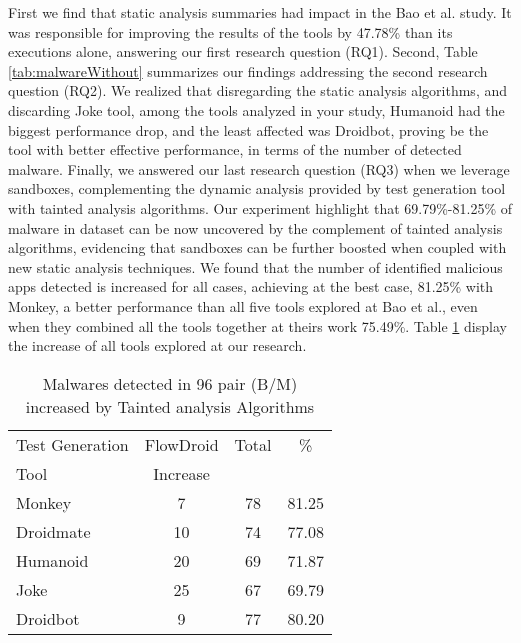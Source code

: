 First we find that static analysis summaries had impact in the Bao et al. study. It was responsible for improving the results of the tools by 47.78\% than its executions alone, answering our first research question (RQ1). Second, Table \ref{tab:malwareWithout} summarizes our findings addressing the second research question (RQ2). We realized that disregarding the static analysis algorithms, and discarding Joke tool, among the tools analyzed in your study, Humanoid had the biggest performance drop, and the least affected was Droidbot, proving be the tool with better effective performance, in terms of the number of detected malware. Finally, we answered our last research question (RQ3) when we leverage sandboxes, complementing the dynamic analysis provided by test generation tool with tainted analysis algorithms. Our experiment highlight that 69.79\%-81.25\% of malware in dataset can be now uncovered by the complement of tainted analysis algorithms, evidencing that 
sandboxes can be further boosted when coupled with new static analysis techniques. We found that the number of identified malicious apps detected is increased for all cases, achieving at the best case, 81.25\% with Monkey, a better performance than all five tools explored at Bao et al., even when they combined all the tools together at theirs work 75.49\%. Table \ref{tab:tanted} display the increase of all tools explored at our research.

\begin{table}[ht]
\centering
\begin{tabular}{lccc}\toprule
 Test Generation & FlowDroid & Total & \%\\
 Tool & Increase  &  & \\ \midrule
 Monkey & 7 & 78 & 81.25\\
 Droidmate & 10 &  74 & 77.08 \\
 Humanoid & 20 & 69 & 71.87  \\
 Joke & 25 & 67 & 69.79 \\
 Droidbot & 9 & 77 & 80.20  \\\midrule
 
\end{tabular} 
\caption{Malwares detected in 96 pair (B/M) increased by Tainted analysis Algorithms}
\label{tab:tanted}
\end{table}




